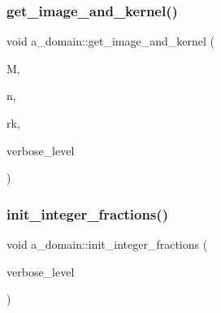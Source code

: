 \mbox{\label{classa__domain_aa8d5ed906e9c90919050311f1126ffc3}} 
\subsubsection{\texorpdfstring{get\+\_\+image\+\_\+and\+\_\+kernel()}{get\_image\_and\_kernel()}}
{\footnotesize\ttfamily void a\+\_\+domain\+::get\+\_\+image\+\_\+and\+\_\+kernel (\begin{DoxyParamCaption}\item[{\mbox{\hyperlink{galois_8h_a09fddde158a3a20bd2dcadb609de11dc}{I\+NT}} $\ast$}]{M,  }\item[{\mbox{\hyperlink{galois_8h_a09fddde158a3a20bd2dcadb609de11dc}{I\+NT}}}]{n,  }\item[{\mbox{\hyperlink{galois_8h_a09fddde158a3a20bd2dcadb609de11dc}{I\+NT}} \&}]{rk,  }\item[{\mbox{\hyperlink{galois_8h_a09fddde158a3a20bd2dcadb609de11dc}{I\+NT}}}]{verbose\+\_\+level }\end{DoxyParamCaption})}

\mbox{\label{classa__domain_a78ac7c303c06cd4337514fd7e02838e2}} 
\subsubsection{\texorpdfstring{init\+\_\+integer\+\_\+fractions()}{init\_integer\_fractions()}}
{\footnotesize\ttfamily void a\+\_\+domain\+::init\+\_\+integer\+\_\+fractions (\begin{DoxyParamCaption}\item[{\mbox{\hyperlink{galois_8h_a09fddde158a3a20bd2dcadb609de11dc}{I\+NT}}}]{verbose\+\_\+level }\end{DoxyParamCaption})}

\mbox{\label{classa__domain_acfabbad9b7871cff00c17d0e289b4ddd}} 
